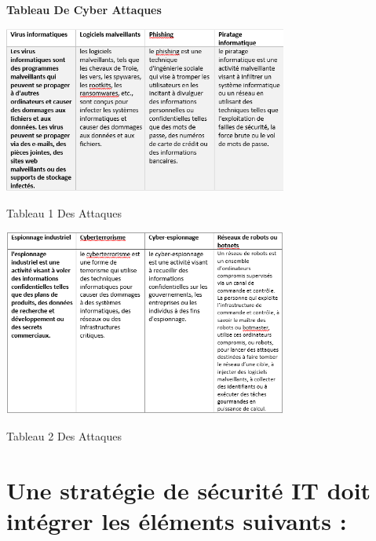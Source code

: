  
    \textbf{Tableau De Cyber Attaques}
   \begin{table}[h]
 		\begin{center}
 		\includegraphics[width=0.7\textwidth]{PhotoMemoire/tableau1_attaques.png}
 		\caption{Tableau 1  Des Attaques}
 		  \end{center}
  \end{table}
 \vspace{2 cm}
 	\begin{table}[h]
 		\begin{center}
 		\includegraphics[width=0.7\textwidth]{PhotoMemoire/tableau2_attaques.png}
 		\caption{Tableau 2  Des Attaques}
 		 \end{center}
 	\end{table}
 
\section*{\textbf{Une stratégie de sécurité IT doit intégrer les éléments suivants :}}

